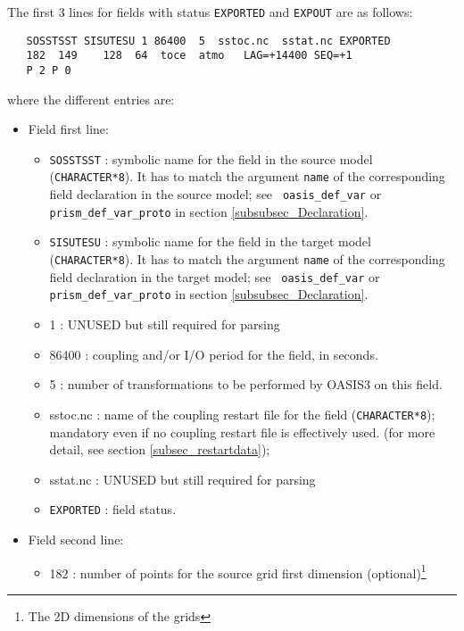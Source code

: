   The first 3 lines for fields with status {\tt EXPORTED} and 
  {\tt EXPOUT} are as follows:
  \begin{verbatim}
   SOSSTSST SISUTESU 1 86400  5  sstoc.nc  sstat.nc EXPORTED
   182  149    128  64  toce  atmo   LAG=+14400 SEQ=+1
   P 2 P 0 
  \end{verbatim}
\vspace{-0.2cm}
  where the different entries are:
    \begin{itemize}
      \item Field first line:
        \begin{itemize}
        \item {\tt SOSSTSST} : symbolic name for the field in the
              source model ({\tt CHARACTER*8}). It has to match the
              argument {\tt name} of the corresponding field
              declaration in the source model; see {\tt
                oasis\_def\_var} or {\tt
              prism\_def\_var\_proto} in section
              \ref{subsubsec_Declaration}.
        \item {\tt SISUTESU} : symbolic name for the field in the
              target model ({\tt CHARACTER*8}).  It has to match the
              argument {\tt name} of the corresponding field
              declaration in the target model; see {\tt
                oasis\_def\_var} or {\tt
              prism\_def\_var\_proto} in section
              \ref{subsubsec_Declaration}.
        \item 1 : UNUSED but still required for parsing
        \item 86400 : coupling and/or I/O period for the field, in
        seconds. 
        \item 5 : number of transformations to be performed by OASIS3 on this field.  
        \item sstoc.nc : name of the coupling restart file for the
          field ({\tt CHARACTER*8}); 
          mandatory even if no coupling restart file is effectively
          used. (for more detail, see section \ref{subsec_restartdata});
        \item sstat.nc : UNUSED but still required for parsing
        \item {\tt EXPORTED} : field status.
        \end{itemize}
      \item Field second line:
        \begin{itemize}
        \item 182 : number of points for the source grid first
        dimension (optional)\footnote{The 2D dimensions of the grids
}
\end{itemize}
\end{itemize}
